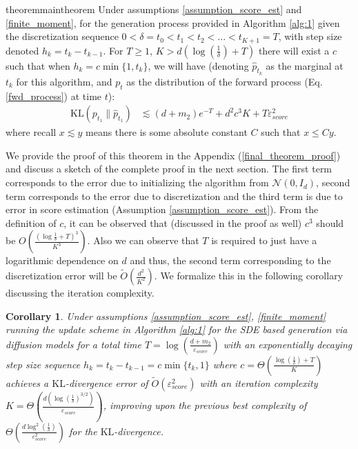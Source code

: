 \documentclass{article}
\newcommand{\KL}[2]{\mathrm{KL}\left(#1 \big\| #2\right)}
\newtheorem{corollary}[lemma]{Corollary}
\begin{document}
\begin{restatable}{theorem}{maintheorem}
\label{main_theorem_non_smooth}
    Under assumptions \ref{assumption_score_est} and \ref{finite_moment}, for the generation process provided in Algorithm \ref{alg:1}
    given the discretization sequence $0<\delta=t_0<t_1<t_2<...<t_{K+1}=T$, with step size denoted $h_k = t_k-t_{k-1}$. For $T\geq 1$, $K > d(\log(\frac{1}{\delta}) + T)$ there will exist a $c$  such that when $h_k = c \min\{1,t_k\}$, we will have (denoting $\hat{p}_{t_k}$ as the marginal at $t_k$ for this algorithm, and $p_t$ as the distribution of the forward process (Eq. \ref{fwd_process}) at time $t$):
     \begin{align}
     \label{main_thm_eq}
         \KL{p_{t_1}}{\hat{p}_{t_1}}
         &\lesssim (d+m_2)e^{-T} + d^2c^3K + T \varepsilon^2_{score} 
    \end{align}
where recall $x\lesssim y$ means there is some absolute constant $C$ such that $x \leq Cy$.
\end{restatable}

\noindent
We provide the proof of this theorem in the Appendix (\ref{final_theorem_proof}) and discuss a sketch of the complete proof in the next section. The first term corresponds to the error due to initializing the algorithm from $\mathcal{N}(0,I_d)$, second term corresponds to the error due to discretization and the third term is due to error in score estimation (Assumption \ref{assumption_score_est}). 
From the definition of $c$, it can be observed that (discussed in the proof as well) $c^3$ should be $O\left(\frac{(\log \frac{1}{\delta}+T)^3}{K^3}\right)$. Also we can observe that $T$ is required to just have a logarithmic dependence on $d$ and thus, the second term corresponding to the discretization error will be $\tilde{O}\left(\frac{d^2}{K^2}\right)$. 
We formalize this in the following corollary discussing the iteration complexity.

\begin{corollary}
\label{main_corollary}
    Under assumptions \ref{assumption_score_est}, \ref{finite_moment} running the update scheme in Algorithm \ref{alg:1} for the SDE based generation via diffusion models for a total time $T=\log\left(\frac{d+m_2}{\varepsilon_{score}}\right)$ with an exponentially decaying step size sequence $h_k = t_k-t_{k-1} = c\min\{t_k,1\}$ where $c=\Theta\left(\frac{\log(\frac{1}{\delta})+T}{K}\right)$  achieves a $\mathrm{KL}$-divergence error of $\tilde{O}(\varepsilon^2_{score})$ with an iteration complexity $K= \Theta\left(\frac{d\left(\log (\frac{1}{\delta})^{3/2}\right)}{\varepsilon_{score}}\right)$, improving upon the previous best complexity \cite{benton2023nearly} of $\Theta\left(\frac{d \log^2(\frac{1}{\delta})}{\varepsilon^2_{score}}\right)$ for the $\mathrm{KL}$-divergence.
\end{corollary}
\end{document}

